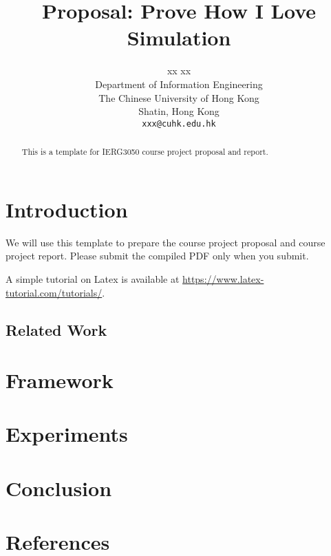 \documentclass{article}
\title{Proposal: Prove How I Love Simulation}
\author{%
  xx xx \\
  Department of Information Engineering\\
  The Chinese University of Hong Kong\\
  Shatin, Hong Kong \\
  \texttt{xxx@cuhk.edu.hk} \\
}
\begin{document}

\maketitle

\begin{abstract}
This is a template for IERG3050 course project proposal and report. \end{abstract}

\section{Introduction}

We will use this template to prepare the course project proposal and course project report. Please submit the compiled PDF only when you submit. 

A simple tutorial on Latex is available at \url{https://www.latex-tutorial.com/tutorials/}.


\subsection{Related Work}


\section{Framework}


\section{Experiments}



\section{Conclusion}





\section*{References}

\medskip

{\small


}
\end{document}
